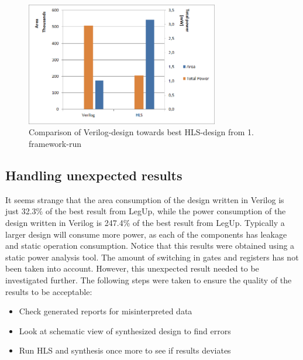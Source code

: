 \begin{figure}[hbpt]
\centering
\includegraphics[width=0.75\textwidth]{../figs/resultComparison1.png}
\caption{\label{fig:resultcomparisonhlsrun1}Comparison of Verilog-design towards best HLS-design from 1. framework-run}
\end{figure}

\subsection{Handling unexpected results}
It seems strange that the area consumption of the design written in Verilog is just 32.3\% of the best result from LegUp, while the power consumption of the design written in Verilog is 247.4\% of the best result from LegUp. Typically a larger design will consume more power, as each of the components has leakage and static operation consumption. Notice that this results were obtained using a static power analysis tool. The amount of switching in gates and registers has not been taken into account. However, this unexpected result needed to be investigated further. The following steps were taken to ensure the quality of the results to be acceptable:

\begin{itemize}
    \item Check generated reports for misinterpreted data
    \item Look at schematic view of synthesized design to find errors
    \item Run HLS and synthesis once more to see if results deviates
\end{itemize}

